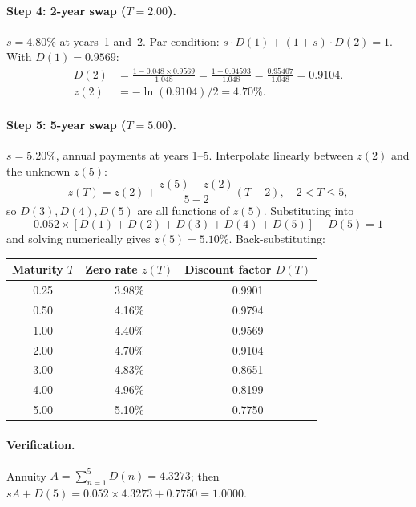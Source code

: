 \paragraph{Step 4: 2-year swap ($T = 2.00$).}
$s = 4.80\%$ at years~1 and~2.  Par condition:
$s \cdot D(1) + (1+s) \cdot D(2) = 1$.  With $D(1) = 0.9569$:
\begin{align}
  D(2) &= \frac{1 - 0.048 \times 0.9569}{1.048}
        = \frac{1 - 0.04593}{1.048}
        = \frac{0.95407}{1.048}
        = 0.9104. \\
  z(2) &= -\ln(0.9104)/2 = 4.70\%.
\end{align}

\paragraph{Step 5: 5-year swap ($T = 5.00$).}
$s = 5.20\%$, annual payments at years 1--5.  Interpolate linearly
between $z(2)$ and the unknown $z(5)$:
\[
  z(T) = z(2) + \frac{z(5) - z(2)}{5 - 2}(T - 2),
  \quad 2 < T \leq 5,
\]
so $D(3),D(4),D(5)$ are all functions of $z(5)$.  Substituting into
\begin{equation}
  0.052 \times [D(1) + D(2) + D(3) + D(4) + D(5)] + D(5) = 1
  \label{eq:bootstrap_5y}
\end{equation}
and solving numerically gives $z(5) = 5.10\%$.  Back-substituting:

\begin{center}
\begin{tabular}{ccc}
\toprule
\textbf{Maturity $T$} & \textbf{Zero rate $z(T)$} &
  \textbf{Discount factor $D(T)$} \\
\midrule
0.25 & 3.98\% & 0.9901 \\
0.50 & 4.16\% & 0.9794 \\
1.00 & 4.40\% & 0.9569 \\
2.00 & 4.70\% & 0.9104 \\
3.00 & 4.83\% & 0.8651 \\
4.00 & 4.96\% & 0.8199 \\
5.00 & 5.10\% & 0.7750 \\
\bottomrule
\end{tabular}
\end{center}

\paragraph{Verification.}
Annuity $A = \sum_{n=1}^{5} D(n) = 4.3273$; then
$sA + D(5) = 0.052 \times 4.3273 + 0.7750 = 1.0000$.  \checkmark

